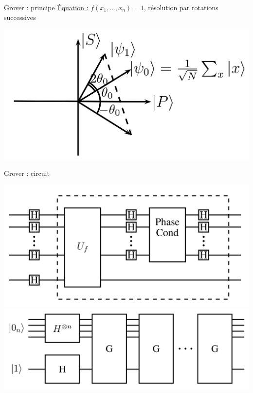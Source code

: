 \documentclass[french]{beamer}
\begin{document}
\begin{frame}{Grover : principe}
    \underline{Équation :} $f(x_1, ..., x_n) = 1$, résolution par rotations successives
    \begin{center}
        \includegraphics[scale=0.1]{Rotations.png}
    \end{center}
\end{frame}

\begin{frame}{Grover : circuit}
    \begin{center}
        \includegraphics[scale=0.08]{PorteGrover.png}
        \includegraphics[scale=0.08]{CircuitGrover.png}
    \end{center}
\end{frame}
\end{document}
